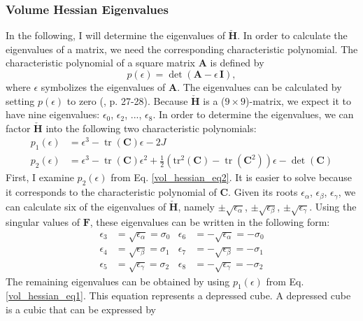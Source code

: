{{{\subsubsection{Volume Hessian Eigenvalues}
In the following, I will determine the eigenvalues of $\mathbf{\check{H}}$. In order to calculate the eigenvalues of a matrix, we need the corresponding characteristic polynomial. The characteristic polynomial of a square matrix $\mathbf{A}$ is defined by
\[
	p(\epsilon) = \operatorname{det}(\mathbf{A}-\epsilon \, \mathbf{I}),
\]
where $\epsilon$ symbolizes the eigenvalues of $\mathbf{A}$. The eigenvalues can be calculated by setting $p(\epsilon)$ to zero (\cite{Spencer1980}, p. 27-28). Because $\mathbf{\check{H}}$ is a ($9 \times 9$)-matrix, we expect it to have nine eigenvalues: $\epsilon_0$, $\epsilon_2$, ..., $\epsilon_8$. In order to determine the eigenvalues, we can factor $\mathbf{\check{H}}$ into the following two characteristic polynomials:
\begin{align}
p_1(\epsilon) &= \epsilon^3 - \operatorname{tr}(\mathbf{C}) \epsilon - 2 J  \label{vol_hessian_eq1} \\
p_2(\epsilon)&=\epsilon^3 - \operatorname{tr}(\mathbf{C}) \epsilon^2 + \frac{1}{2} \left( \operatorname{tr^2}(\mathbf{C}) - \operatorname{tr}(\mathbf{C}^2) \right) \epsilon - \operatorname{det}(\mathbf{C}) \label{vol_hessian_eq2}
\end{align}
First, I examine $p_2(\epsilon)$ from Eq. \eqref{vol_hessian_eq2}. It is easier to solve because it corresponds to the characteristic polynomial of $\mathbf{C}$. Given its roots $\epsilon_\alpha$, $\epsilon_\beta$, $\epsilon_\gamma$, we can calculate six of the eigenvalues of $\mathbf{\check{H}}$, namely $\pm \sqrt{\epsilon_\alpha}$, $\pm \sqrt{\epsilon_\beta}$, $\pm \sqrt{\epsilon_\gamma}$. Using the singular values of $\mathbf{F}$, these eigenvalues can be written in the following form:
\begin{align}
\label{eq:hessian_eigenvalues1}
\epsilon_3 &= \sqrt{\epsilon_\alpha} = \sigma_0 & \epsilon_6 &= -\sqrt{\epsilon_\alpha} = -\sigma_0 \nonumber \\
\epsilon_4 &=  \sqrt{\epsilon_\beta} = \sigma_1 & \epsilon_7 &=  -\sqrt{\epsilon_\beta} = -\sigma_1 \\
\epsilon_5 &= \sqrt{\epsilon_\gamma} = \sigma_2 & \epsilon_8 &= -\sqrt{\epsilon_\gamma} = -\sigma_2 \nonumber
\end{align}
The remaining eigenvalues can be obtained by using $p_1(\epsilon)$ from Eq. \eqref{vol_hessian_eq1}. This equation represents a depressed cube. A depressed cube is a cubic that can be expressed by
}}}
